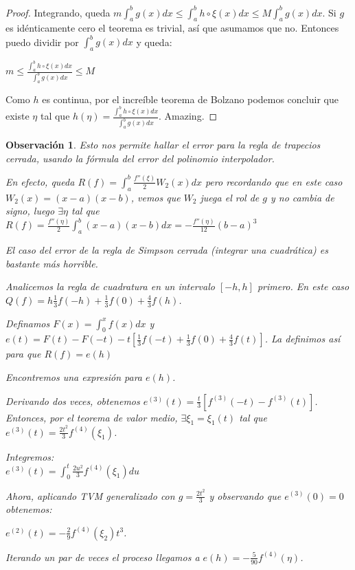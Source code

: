 \documentclass[10pt,a4paper,final]{report}
\newtheorem{observation}{Observación}
\begin{document}
{\begin{proof}
	Integrando, queda $m \int_a^b g(x) dx \leq \int_a^b h\circ \xi(x) dx \leq M \int_a^b g(x) dx$. Si $g$ es idénticamente cero el teorema es trivial, así que asumamos que no. Entonces puedo dividir por $\int_a^b g(x) dx$ y queda:
	
	$m \leq \frac{\int_a^b h\circ \xi(x) dx}{\int_a^b g(x) dx} \leq M$
	
	Como $h$ es continua, por el increíble teorema de Bolzano podemos concluir que existe $\eta$ tal que $h(\eta)=\frac{\int_a^b h\circ \xi(x) dx}{\int_a^b g(x) dx}$. Amazing.
\end{proof}

\begin{observation}
Esto nos permite hallar el error para la regla de trapecios cerrada, usando la fórmula del error del polinomio interpolador.

En efecto, queda $R(f) = \int_a^b \frac{f''(\xi)}{2} W_2(x) dx$ pero recordando que en este caso $W_2(x)=(x-a)(x-b)$, vemos que $W_2$ juega el rol de $g$ y no cambia de signo, luego $\exists \eta$ tal que $R(f) = \frac{f''(\eta)}{2} \int_a^b (x-a)(x-b) dx = - \frac{f''(\eta)}{12} (b-a)^3$


El caso del error de la regla de Simpson cerrada (integrar una cuadrática) es bastante más horrible.

Analicemos la regla de cuadratura en un intervalo $[-h,h]$ primero. En este caso $Q(f)=h\frac{1}{3}f(-h) + \frac{1}{3}f(0) + \frac{4}{3}f(h)$.

Definamos $F(x) = \int_0^x f(x) dx$ y $e(t) = F(t) - F(-t) - t[\frac{1}{3}f(-t) + \frac{1}{3} f(0) + \frac{4}{3} f(t)]$. La definimos así para que $R(f)=e(h)$

Encontremos una expresión para $e(h)$.

Derivando dos veces, obtenemos $e^{(3)}(t) = \frac{t}{3}[f^{(3)}(-t)-f^{(3)}(t)]$.\\

Entonces, por el teorema de valor medio, $\exists \xi_1 = \xi_1(t)$ tal que $e^{(3)}(t) = \frac{2t^2}{3} f^{(4)}(\xi_1)$.

Integremos:\\

$e^{(3)}(t) = \int_0^t \frac{2u^2}{3} f^{(4)}(\xi_1) du$

Ahora, aplicando TVM generalizado con $g=\frac{2t^2}{3}$ y observando que $e^{(3)}(0)=0$ obtenemos:

$e^{(2)}(t) = -\frac{2}{9} f^{(4)}(\xi_2)t^3$.

Iterando un par de veces el proceso llegamos a $e(h) = -\frac{5}{90}f^{(4)}(\eta)$.


\end{observation}}
\end{document}
